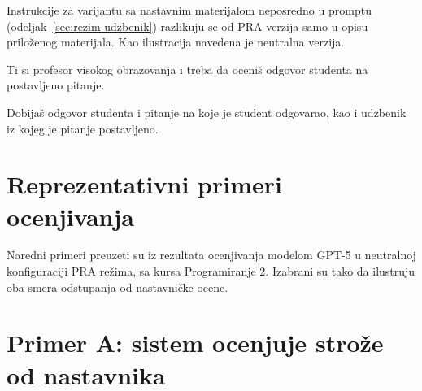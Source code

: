 Instrukcije za varijantu sa nastavnim materijalom neposredno u promptu (odeljak~\ref{sec:rezim-udzbenik})
razlikuju se od PRA verzija samo u opisu priloženog materijala.
Kao ilustracija navedena je neutralna verzija.

\begin{tcolorbox}[promptbox, title={Neutralna konfiguracija, varijanta sa nastavnim materijalom}]

Ti si profesor visokog obrazovanja i treba da oceniš odgovor studenta na postavljeno pitanje.

Dobijaš odgovor studenta i pitanje na koje je student odgovarao, kao i udzbenik iz kojeg je pitanje postavljeno.

\end{tcolorbox}

\section*{Reprezentativni primeri ocenjivanja}

Naredni primeri preuzeti su iz rezultata ocenjivanja modelom GPT-5 u neutralnoj konfiguraciji PRA režima, sa kursa Programiranje 2.
Izabrani su tako da ilustruju oba smera odstupanja od nastavničke ocene.

\section*{Primer A: sistem ocenjuje strože od nastavnika}

